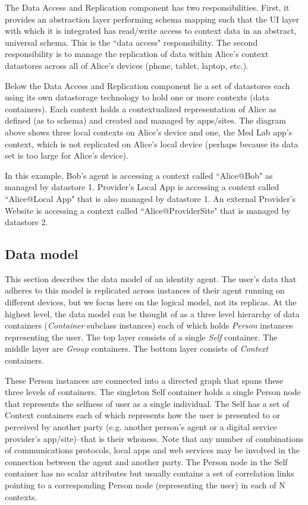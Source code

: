 \documentclass[11pt, oneside]{article}   	%
\begin{document}
The Data Access and Replication component has two responsibilities. First, it provides an abstraction layer performing schema mapping such that the UI layer with which it is integrated has read/write access to context data in an abstract, universal schema. This is the ``data access" responsibility. The second responsibility is to manage the replication of data within Alice's context datastores across all of Alice's devices (phone, tablet, laptop, etc.). 

Below the Data Access and Replication component lie a set of datastores each using its own datastorage technology to hold one or more contexts (data containers). Each context holds a contextualized representation of Alice as defined (as to schema) and created and managed by apps/sites. The diagram above shows three local contexts on Alice's device and one, the Med Lab app's context, which is not replicated on Alice's local device (perhaps because its data set is too large for Alice's device).

In this example, Bob's agent is accessing a context called ``Alice@Bob" as managed by datastore 1. Provider's Local App is accessing a context called ``Alice@Local App" that is also managed by datastore 1.  An external Provider's Website is accessing a context called ``Alice@ProviderSite" that is managed by datastore 2. 

\subsection{Data model} %

This section describes the data model of an identity agent. The user's data that adheres to this model is replicated across instances of their agent running on different devices, but we focus here on the logical model, not its replicas. At the highest level, the data model can be thought of as a three level hierarchy of data containers (\emph{Container} subclass instances) each of which holds \emph{Person} instances representing the user. The top layer consists of a single \emph{Self} container. The middle layer are \emph{Group} containers. The bottom layer consists of \emph{Context} containers.

These Person instances are connected into a directed graph that spans these three levels of containers. The singleton Self container holds a single Person node that represents the selfness of user as a single individual. The Self has a set of Context containers each of which represents how the user is presented to or perceived by another party (e.g. another person's agent or a digital service provider's app/site)--that is their whoness. Note that any number of combinations of communications protocols, local apps and web services may be involved in the connection between the agent and another party. The Person node in the Self container has no scalar attributes but usually contains a set of correlation links pointing to a corresponding Person node (representing the user) in each of N contexts.
\end{document}
